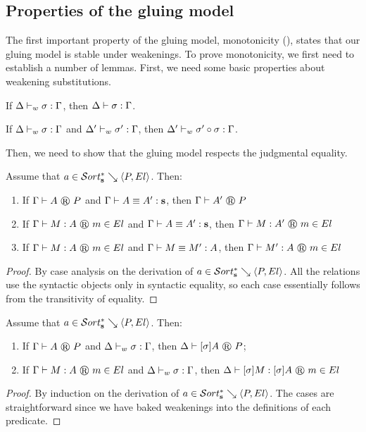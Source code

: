   
\subsection{Properties of the gluing model}

The first important property of the gluing model, monotonicity (), states that our gluing model is stable under weakenings.
To prove monotonicity, we first need to establish a number of lemmas.
First, we need some basic properties about weakening substitutions.

\begin{lemma}
  If $\Delta \vdash_{w} \sigma : \Gamma$, then $\Delta \vdash \sigma : \Gamma$.
\end{lemma}

\begin{lemma}
  If $\Delta \vdash_{w} \sigma : \Gamma$ and $\Delta' \vdash_{w} \sigma' : \Gamma$, then $\Delta' \vdash_{w} \sigma' \circ \sigma : \Gamma$.
\end{lemma}

Then, we need to show that the gluing model respects the judgmental equality.

\begin{lemma}
  Assume that $\glusortrel a P {El}$.  Then:
  \begin{enumerate}
  \item If $\glutpjudg \Gamma A P$ and $\Gamma \vdash A \equiv A' : \textbf{s}$, then $\glutpjudg \Gamma {A'} P$
  \item If $\glutmjudg \Gamma M A m {El}$ and $\Gamma \vdash A \equiv A' : \textbf{s}$, then $\glutmjudg \Gamma M {A'} m El$
  \item If $\glutmjudg \Gamma M A m {El}$ and $\Gamma \vdash M \equiv M' : A$, then $\glutmjudg \Gamma {M'} A m El$
  \end{enumerate}
\end{lemma}
\begin{proof}
  By case analysis on the derivation of $\glusortrel a P {El}$.
  All the relations use the syntactic objects only in syntactic equality, so each case essentially follows from the transitivity of equality.
\end{proof}

\begin{lemma}[Monotonicity]
  \label{lemma:monotonicity}
  Assume that $\glusortrel a P {El}$.  Then:
  \begin{enumerate}
  \item If $\glutpjudg \Gamma A P$ and $\Delta \vdash_{w} \sigma : \Gamma$, then $\glutpjudg \Delta {\tmclo \sigma A} P$;
  \item If $\glutmjudg \Gamma M A m {El}$ and $\Delta \vdash_{w} \sigma : \Gamma$, then $\glutmjudg \Delta {\tmclo \sigma M} {\tmclo \sigma A} m {El}$
  \end{enumerate}
\end{lemma}
\begin{proof}
  By induction on the derivation of $\glusortrel a P {El}$.
  The cases are straightforward since we have baked weakenings into the definitions of each predicate.
\end{proof}


